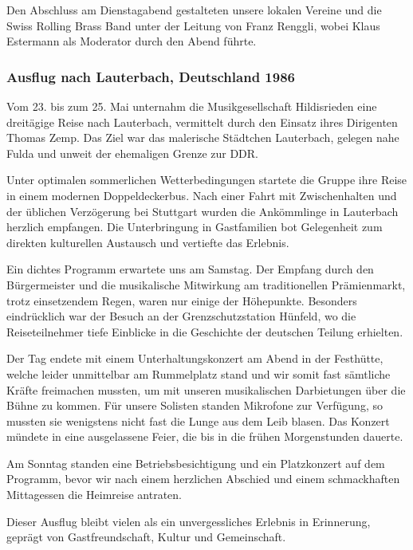 \begin{history}

    Den Abschluss am Dienstagabend gestalteten unsere lokalen Vereine und die
    Swiss Rolling Brass Band unter der Leitung von Franz Renggli, wobei Klaus
    Estermann als Moderator durch den Abend führte.

    \subsubsection*{Ausflug nach Lauterbach, Deutschland 1986}

    Vom 23. bis zum 25. Mai unternahm die Musikgesellschaft Hildisrieden eine
    dreitägige Reise nach Lauterbach, vermittelt durch den Einsatz ihres
    Dirigenten Thomas Zemp. Das Ziel war das malerische Städtchen Lauterbach,
    gelegen nahe Fulda und unweit der ehemaligen Grenze zur DDR.

    Unter optimalen sommerlichen Wetterbedingungen startete die Gruppe ihre
    Reise in einem modernen Doppeldeckerbus. Nach einer Fahrt mit Zwischenhalten
    und der üblichen Verzögerung bei Stuttgart wurden die Ankömmlinge in
    Lauterbach herzlich empfangen. Die Unterbringung in Gastfamilien bot
    Gelegenheit zum direkten kulturellen Austausch und vertiefte das Erlebnis.

    Ein dichtes Programm erwartete uns am Samstag. Der Empfang durch den
    Bürgermeister und die musikalische Mitwirkung am traditionellen
    Prämienmarkt, trotz einsetzendem Regen, waren nur einige der Höhepunkte.
    Besonders eindrücklich war der Besuch an der Grenzschutzstation Hünfeld, wo
    die Reiseteilnehmer tiefe Einblicke in die Geschichte der deutschen Teilung
    erhielten.

    Der Tag endete mit einem Unterhaltungskonzert am Abend in der Festhütte,
    welche leider unmittelbar am Rummelplatz stand und wir somit fast sämtliche
    Kräfte freimachen mussten, um mit unseren musikalischen Darbietungen über
    die Bühne zu kommen. Für unsere Solisten standen Mikrofone zur Verfügung, so
    mussten sie wenigstens nicht fast die Lunge aus dem Leib blasen. Das Konzert
    mündete in eine ausgelassene Feier, die bis in die frühen Morgenstunden
    dauerte.

    Am Sonntag standen eine Betriebsbesichtigung und ein Platzkonzert auf dem
    Programm, bevor wir nach einem herzlichen Abschied und einem schmackhaften
    Mittagessen die Heimreise antraten.

    Dieser Ausflug bleibt vielen als ein unvergessliches Erlebnis in Erinnerung,
    geprägt von Gastfreundschaft, Kultur und Gemeinschaft.


\end{history}
